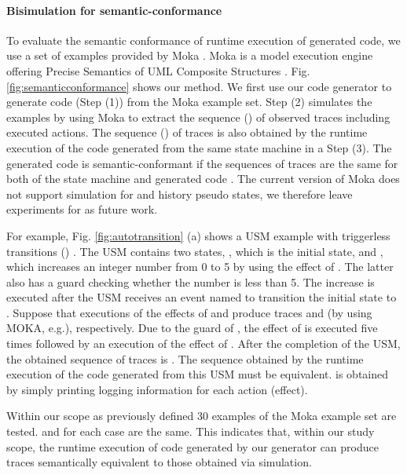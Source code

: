 \paragraph{Bisimulation for semantic-conformance}
To evaluate the semantic conformance of runtime execution of generated code, we use a set of examples provided by Moka \cite{moka}. Moka is a model execution engine offering Precise Semantics of UML Composite Structures \cite{OMG2015}. Fig. \ref{fig:semanticconformance} shows our method. We first use our code generator to generate code (Step (1)) from the Moka example set. Step (2) simulates the examples by using Moka to extract the sequence () of observed traces including executed actions. The sequence () of traces is also obtained by the runtime execution of the code generated from the same state machine in a Step (3). The generated code is semantic-conformant if the sequences of traces are the same for both of the state machine and generated code \cite{Blech2005}. The current version of Moka does not support simulation for  and history pseudo states, we therefore leave experiments for  as future work.

For example, Fig. \ref{fig:autotransition} (a) shows a USM example with triggerless transitions () . 
The USM contains two states, , which is the initial state, and , which increases an integer number from 0 to 5 by using the effect of . The latter also has a guard checking whether the number is less than 5.
The increase is executed after the USM receives an event named  to transition the initial state  to . 
Suppose that executions of the effects of  and  produce traces  and  (by using MOKA, e.g.), respectively. 
Due to the guard of , the effect of  is executed five times followed by an execution of the effect of .
After the completion of the USM, the obtained sequence of traces
is . 
The sequence obtained by the runtime execution of the code generated from this USM must be equivalent. 
 is obtained by simply printing logging information for each action (effect).

Within our scope as previously defined 30 examples of the Moka example set are tested.  and  for each case are the same. 
This indicates that, within our study scope, the runtime execution of code generated by our generator can produce traces semantically equivalent to those obtained via simulation. 


